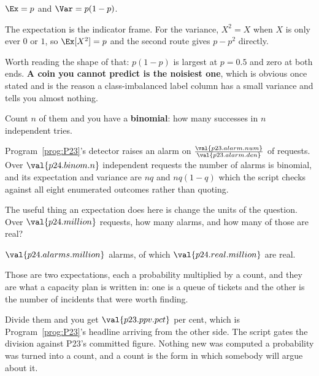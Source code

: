 \begin{fr}
\begin{ansblock}
$\Ex = p$ and $\Var = p(1-p)$.
\end{ansblock}

The expectation is the indicator frame. For the variance, $X^{2} = X$ when $X$
is only ever $0$ or $1$, so $\Ex[X^{2}] = p$ and the second route gives
$p - p^{2}$ directly.

Worth reading the shape of that: $p(1-p)$ is largest at $p = \num{0.5}$ and
zero at both ends. \textbf{A coin you cannot predict is the noisiest one},
which is obvious once stated and is the reason a class-imbalanced label column
has a small variance and tells you almost nothing.
\end{fr}

\begin{fr}
Count $n$ of them and you have a \textbf{binomial}: how many successes in $n$
independent tries.

Program~\ref{prog:P23}'s detector raises an alarm on
$\frac{\val{p23.alarm.num}}{\val{p23.alarm.den}}$ of requests. Over
$\val{p24.binom.n}$ independent requests the number of alarms is binomial, and
its expectation and variance are $nq$ and $nq(1-q)$ \dash{} which the script
checks against all eight enumerated outcomes rather than quoting.

The useful thing an expectation does here is change the units of the question.
Over $\val{p24.million}$ requests, how many alarms, and how many of those are
real?
\dotline
\nextframe
\end{fr}

\begin{fr}
\begin{ansblock}
$\val{p24.alarms.million}$ alarms, of which $\val{p24.real.million}$ are real.
\end{ansblock}

Those are two expectations, each a probability multiplied by a count, and they
are what a capacity plan is written in: one is a queue of tickets and the
other is the number of incidents that were worth finding.

Divide them and you get $\val{p23.ppv.pct}$ per cent, which is
Program~\ref{prog:P23}'s headline arriving from the other side. The script
gates the division against P23's committed figure. Nothing new was computed
\dash{} a probability was turned into a count, and a count is the form in which
somebody will argue about it.
\end{fr}

